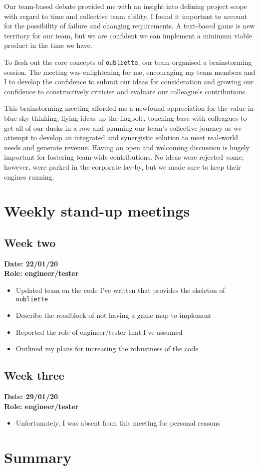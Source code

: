 \documentclass[12pt, a4]{article}
\begin{document}
Our team-based debate provided me with an insight into defining project scope
with regard to time and collective team ability. I found it important to account
for the possibility of failure and changing requirements. A text-based game is
new territory for our team, but we are confident we can implement a minimum
viable product in the time we have.

To flesh out the core concepts of \texttt{oubliette}, our team organised a
brainstorming session. The meeting was enlightening for me, encouraging my
team members and I to develop the confidence to submit our ideas for
consideration and growing our confidence to constructively criticise and evaluate
our colleague's contributions.

This brainstorming meeting afforded me a newfound appreciation for the value
in blue-sky thinking, flying ideas up the flagpole, touching base with
colleagues to get all of our ducks in a row and planning our team's collective
journey as we attempt to develop an integrated and synergistic solution to
meet real-world needs and generate revenue. Having an open and welcoming
discussion is hugely important for fostering team-wide contributions. No ideas
were rejected--some, however, were parked in the corporate lay-by, but we made
sure to keep their engines running.

\section{Weekly stand-up meetings}
\subsection{Week two}
\textbf{Date: 22/01/20} \\ \textbf{Role: engineer/tester}
\begin{itemize}
\item Updated team on the code I've written that provides the skeleton of
\texttt{oubliette}
\item Describe the roadblock of not having a game map to implement
\item Reported the role of engineer/tester that I've assumed
\item Outlined my plans for increasing the robustness of the code
\end{itemize}

\subsection{Week three}
\textbf{Date: 29/01/20} \\ \textbf{Role: engineer/tester}
\begin{itemize}
\item Unfortunately, I was absent from this meeting for personal reasons
\end{itemize}

\section{Summary}


\end{document}
